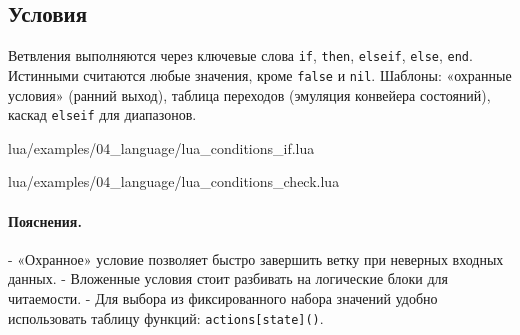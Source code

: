 \subsection{Условия}
Ветвления выполняются через ключевые слова \texttt{if}, \texttt{then}, \texttt{elseif}, \texttt{else}, \texttt{end}. Истинными считаются любые значения, кроме \texttt{false} и \texttt{nil}. Шаблоны: «охранные условия» (ранний выход), таблица переходов (эмуляция конвейера состояний), каскад \texttt{elseif} для диапазонов.
\begin{codefile}{lua/examples/04_language/lua_conditions_if.lua}
\end{codefile}
\begin{codefile}{lua/examples/04_language/lua_conditions_check.lua}
\end{codefile}
\paragraph{Пояснения.}
- «Охранное» условие позволяет быстро завершить ветку при неверных входных данных.
- Вложенные условия стоит разбивать на логические блоки для читаемости.
- Для выбора из фиксированного набора значений удобно использовать таблицу функций: \verb|actions[state]()|.
